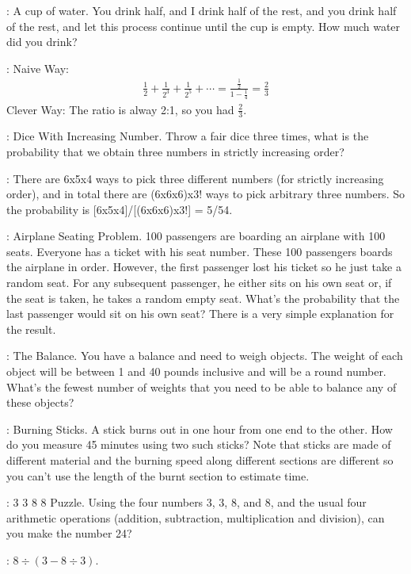 \documentclass{article}
\begin{document}
\Q: A cup of water. You drink half, and I drink half of the rest, and you drink half of the rest, and let this process continue until the cup is empty. How much water did you drink?

\A: Naive Way: 
\begin{align}
	\frac{1}{2} + \frac{1}{2^3} + \frac{1}{2^5} + \cdots = \frac{\frac{1}{2}}{1-\frac{1}{4}} = \frac{2}{3}
\end{align}
Clever Way: The ratio is alway 2:1, so you had $\frac{2}{3}$.

\Q: Dice With Increasing Number. Throw a fair dice three times, what is the probability that we obtain three numbers in strictly increasing order?

\A: There are 6x5x4 ways to pick three different numbers (for strictly increasing order), and in total there are (6x6x6)x3! ways to pick arbitrary three numbers. So the probability is [6x5x4]/[(6x6x6)x3!] = 5/54.

\Q: Airplane Seating Problem. 100 passengers are boarding an airplane with 100 seats. Everyone has a ticket with his seat number. These 100 passengers boards the airplane in order. However, the first passenger lost his ticket so he just take a random seat. For any subsequent passenger, he either sits on his own seat or, if the seat is taken, he takes a random empty seat. What's the probability that the last passenger would sit on his own seat? There is a very simple explanation for the result.

\Q: The Balance. You have a balance and need to weigh objects. The weight of each object will be between 1 and 40 pounds inclusive and will be a round number. What’s the fewest number of weights that you need to be able to balance any of these objects?

\Q: Burning Sticks. A stick burns out in one hour from one end to the other. How do you measure 45 minutes using two such sticks? Note that sticks are made of different material and the burning
speed along different sections are different so you can't use the length of the burnt section to estimate time.

\Q: 3 3 8 8 Puzzle. Using the four numbers 3, 3, 8, and 8, and the usual four arithmetic operations (addition, subtraction, multiplication and division), can you make the number 24?

\A: $8 \div (3- 8 \div 3)$.
\end{document}
